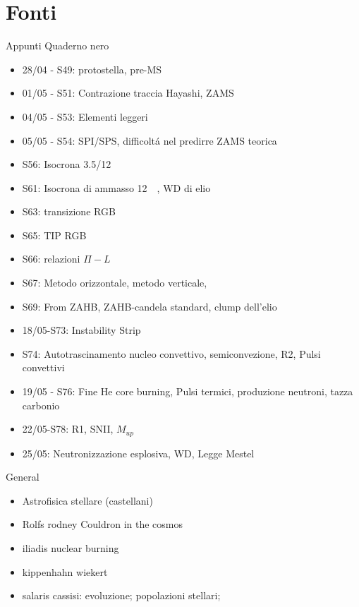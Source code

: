 \section{Fonti}

\begin{frame}{Appunti Quaderno nero}
            \begin{itemize}
                \item 28/04 - S49: protostella, pre-MS
                \item 01/05 - S51: Contrazione traccia Hayashi, ZAMS
                \item 04/05 - S53: Elementi leggeri
                \item 05/05 - S54: SPI/SPS, difficolt\'a nel predirre ZAMS teorica
                \item S56: Isocrona 3.5/12\si{\giga\year}
                \item S61: Isocrona di ammasso \SI{12}{\giga\year}, WD di elio
                \item S63: transizione RGB
                \item S65: TIP RGB
                \item S66: relazioni $\Pi-L$
                \item S67: Metodo orizzontale, metodo verticale, 
                \item S69: From ZAHB, ZAHB-candela standard, clump dell'elio
                \item 18/05-S73: Instability Strip
                \item S74: Autotrascinamento nucleo convettivo, semiconvezione, R2, Pulsi convettivi
                \item 19/05 - S76: Fine He core burning, Pulsi termici, produzione neutroni, tazza carbonio
                \item 22/05-S78: R1, SNII, $M_{up}$
                \item 25/05: Neutronizzazione esplosiva, WD, Legge Mestel
            \end{itemize}
\end{frame}

\begin{frame}{General}
\begin{itemize}
\item Astrofisica stellare (castellani)
\item Rolfs rodney Couldron in the cosmos
\item iliadis nuclear burning
\item kippenhahn wiekert
\item salaris cassisi: evoluzione; popolazioni stellari;
\end{itemize}
\end{frame}

